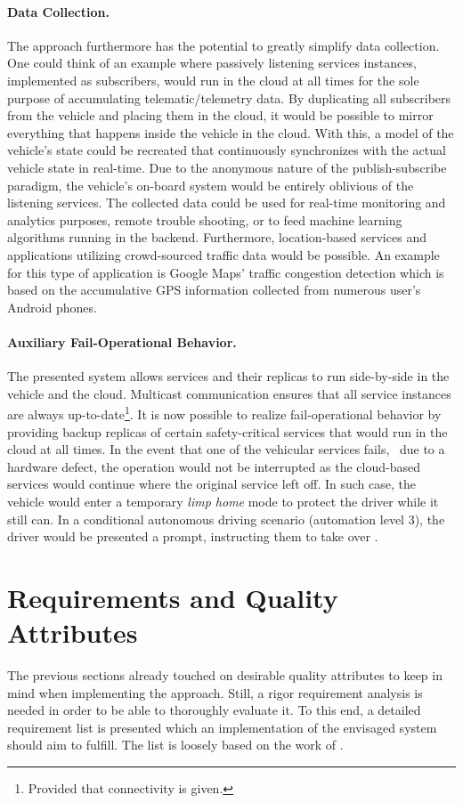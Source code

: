 \paragraph{Data Collection.}
The approach furthermore has the potential to greatly simplify data collection. One could think of an example where passively listening services instances, implemented as subscribers, would run in the cloud at all times for the sole purpose of accumulating telematic/telemetry data. By duplicating all subscribers from the vehicle and placing them in the cloud, it would be possible to mirror everything that happens inside the vehicle in the cloud. With this, a model of the vehicle's state could be recreated that continuously synchronizes with the actual vehicle state in real-time. Due to the anonymous nature of the publish-subscribe paradigm, the vehicle's on-board system would be entirely oblivious of the listening services. The collected data could be used for real-time monitoring and analytics purposes, remote trouble shooting, or to feed machine learning algorithms running in the backend. Furthermore, location-based services and applications utilizing crowd-sourced traffic data would be possible. An example for this type of application is Google Maps' traffic congestion detection which is based on the accumulative GPS information collected from numerous user's Android phones.

\paragraph{Auxiliary Fail-Operational Behavior.}
The presented system allows services and their replicas to run side-by-side in the vehicle and the cloud. Multicast communication ensures that all service instances are always up-to-date\footnote{Provided that connectivity is given.}. It is now possible to realize fail-operational behavior by providing backup replicas of certain safety-critical services that would run in the cloud at all times. In the event that one of the vehicular services fails, \eg\ due to a hardware defect, the operation would not be interrupted as the cloud-based services would continue where the original service left off. In such case, the vehicle would enter a temporary \emph{limp home} mode to protect the driver while it still can. In a conditional autonomous driving scenario (automation level 3), the driver would be presented a prompt, instructing them to take over \cite{kugele2017service}.

%
%
%
%
%
%
%
%
%
%
\section{Requirements and Quality Attributes} \label{sec:requirements}
The previous sections already touched on desirable quality attributes to keep in mind when implementing the approach. Still, a rigor requirement analysis is needed in order to be able to thoroughly evaluate it. To this end, a detailed requirement list is presented which an implementation of the envisaged system should aim to fulfill. The list is loosely based on the work of \citeauthor*{o2007quality} \cite{o2007quality}.


